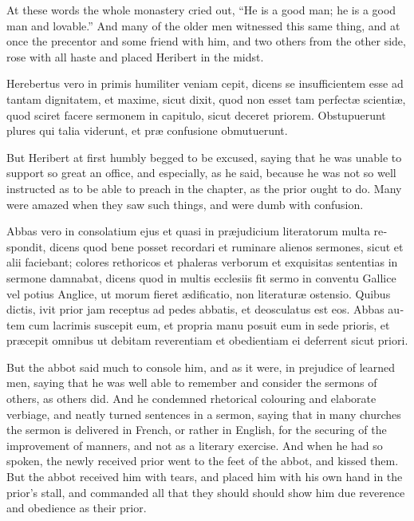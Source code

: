 \documentclass[10pt]{book}
\begin{document}
\begin{paracol}{2}
\switchcolumn

At these words the whole monastery cried out, ``He is a good man; he is a good man and lovable.'' And many of the older men witnessed this same thing, and at once the precentor and some friend with him, and two others from the other side, rose with all haste and placed Heribert in the midst.

\switchcolumn*

\begin{otherlanguage}{latin}
Herebertus vero in primis humiliter veniam cepit, dicens se insufficientem esse ad tantam dignitatem, et maxime, sicut dixit, quod non esset tam perfect\ae{} scienti\ae{}, quod sciret facere sermonem in capitulo, sicut deceret priorem. Obstupuerunt plures qui talia viderunt, et pr\ae{} confusione obmutuerunt. 
\end{otherlanguage}

\switchcolumn

But Heribert at first humbly begged to be excused, saying that he was unable to support so great an office, and especially, as he said, because he was not so well instructed as to be able to preach in the chapter, as the prior ought to do. Many were amazed when they saw such things, and were dumb with confusion.

\switchcolumn*

\begin{otherlanguage}{latin}
Abbas vero in consolatium ejus et quasi in pr\ae{}judicium literatorum multa respondit, dicens quod bene posset recordari et ruminare alienos sermones, sicut et alii faciebant; colores rethoricos et phaleras verborum et exquisitas sententias in sermone damnabat, dicens quod in multis ecclesiis fit sermo in conventu Gallice vel potius Anglice, ut morum fieret \ae{}dificatio, non literatur\ae{} ostensio. Quibus dictis, ivit prior jam receptus ad pedes abbatis, et deosculatus est eos. Abbas autem cum lacrimis suscepit eum, et propria manu posuit eum in sede prioris, et pr\ae{}cepit omnibus ut debitam reverentiam et obedientiam ei deferrent sicut priori.
\end{otherlanguage}

\switchcolumn

But the abbot said much to console him, and as it were, in prejudice of learned men, saying that he was well able to remember and consider the sermons of others, as others did. And he condemned rhetorical colouring and elaborate verbiage, and neatly turned sentences in a sermon, saying that in many churches the sermon is delivered in French, or rather in English, for the securing of the improvement of manners, and not as a literary exercise. And when he had so spoken, the newly received prior went to the feet of the abbot, and kissed them. But the abbot received him with tears, and placed him with his own hand in the prior's stall, and commanded all that they should should show him due reverence and obedience as their prior.


\end{paracol}
\end{document}
